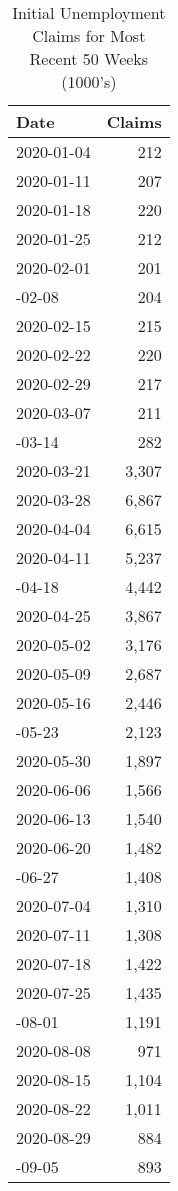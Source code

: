 \documentclass[
]{book}
\begin{document}
\begin{table}

\caption{\label{tab:initial}Initial Unemployment Claims for Most Recent 50 Weeks 
 (1000's)}
\centering
\begin{tabular}[t]{lr}
\toprule
Date & Claims\\
\midrule
2020-01-04 & 212\\
2020-01-11 & 207\\
2020-01-18 & 220\\
2020-01-25 & 212\\
2020-02-01 & 201\\
\addlinespace
2020-02-08 & 204\\
2020-02-15 & 215\\
2020-02-22 & 220\\
2020-02-29 & 217\\
2020-03-07 & 211\\
\addlinespace
2020-03-14 & 282\\
2020-03-21 & 3,307\\
2020-03-28 & 6,867\\
2020-04-04 & 6,615\\
2020-04-11 & 5,237\\
\addlinespace
2020-04-18 & 4,442\\
2020-04-25 & 3,867\\
2020-05-02 & 3,176\\
2020-05-09 & 2,687\\
2020-05-16 & 2,446\\
\addlinespace
2020-05-23 & 2,123\\
2020-05-30 & 1,897\\
2020-06-06 & 1,566\\
2020-06-13 & 1,540\\
2020-06-20 & 1,482\\
\addlinespace
2020-06-27 & 1,408\\
2020-07-04 & 1,310\\
2020-07-11 & 1,308\\
2020-07-18 & 1,422\\
2020-07-25 & 1,435\\
\addlinespace
2020-08-01 & 1,191\\
2020-08-08 & 971\\
2020-08-15 & 1,104\\
2020-08-22 & 1,011\\
2020-08-29 & 884\\
\addlinespace
2020-09-05 & 893\\

\end{tabular}
\end{table}
\end{document}
